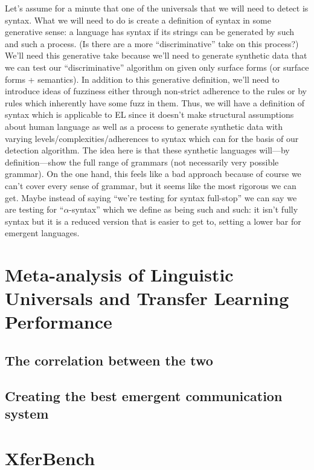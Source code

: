 Let's assume for a minute that one of the universals that we will need to detect is syntax.
What we will need to do is create a definition of syntax in some generative sense: a language has syntax if its strings can be generated by such and such a process.
(Is there are a more ``discriminative'' take on this process?)
We'll need this generative take because we'll need to generate synthetic data that we can test our ``discriminative'' algorithm on given only surface forms (or surface forms + semantics).
In addition to this generative definition, we'll need to introduce ideas of fuzziness either through non-strict adherence to the rules or by rules which inherently have some fuzz in them.
Thus, we will have a definition of syntax which is applicable to EL since it doesn't make structural assumptions about human language as well as a process to generate synthetic data with varying levels/complexities/adherences to syntax which can for the basis of our detection algorithm.
The idea here is that these synthetic languages will---by definition---show the full range of grammars (not necessarily very possible grammar).
On the one hand, this feels like a bad approach because of course we can't cover every sense of grammar, but it seems like the most rigorous we can get.
Maybe instead of saying ``we're testing for syntax full-stop'' we can say we are testing for ``$\alpha$-syntax'' which we define as being such and such: it isn't fully syntax but it is a reduced version that is easier to get to, setting a lower bar for emergent languages.



\chapter{Meta-analysis of Linguistic Universals and Transfer Learning Performance }
\unskip\label{ch:meta-analysis}

\section{The correlation between the two}

\section{Creating the best emergent communication system}




% 

\appendix

\chapter{XferBench}







